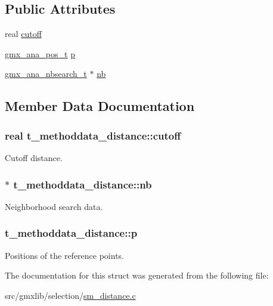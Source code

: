 \subsection*{\-Public \-Attributes}
\begin{DoxyCompactItemize}
\item 
real \hyperlink{structt__methoddata__distance_aab6198756baae9955564ed6c1bef8f35}{cutoff}
\item 
\hyperlink{structgmx__ana__pos__t}{gmx\-\_\-ana\-\_\-pos\-\_\-t} \hyperlink{structt__methoddata__distance_a4e60cc193bb2b70b0a199f573006cc2f}{p}
\item 
\hyperlink{structgmx__ana__nbsearch__t}{gmx\-\_\-ana\-\_\-nbsearch\-\_\-t} $\ast$ \hyperlink{structt__methoddata__distance_a868ce93403a03e7463300e50cfa3bd51}{nb}
\end{DoxyCompactItemize}


\subsection{\-Member \-Data \-Documentation}
\hypertarget{structt__methoddata__distance_aab6198756baae9955564ed6c1bef8f35}{
\subsubsection[{cutoff}]{\setlength{\rightskip}{0pt plus 5cm}real {\bf t\-\_\-methoddata\-\_\-distance\-::cutoff}}}\label{structt__methoddata__distance_aab6198756baae9955564ed6c1bef8f35}
\-Cutoff distance. \hypertarget{structt__methoddata__distance_a868ce93403a03e7463300e50cfa3bd51}{
\subsubsection[{nb}]{$\ast$ {\bf t\-\_\-methoddata\-\_\-distance\-::nb}}}\label{structt__methoddata__distance_a868ce93403a03e7463300e50cfa3bd51}
\-Neighborhood search data. \hypertarget{structt__methoddata__distance_a4e60cc193bb2b70b0a199f573006cc2f}{
\subsubsection[{p}]{ {\bf t\-\_\-methoddata\-\_\-distance\-::p}}}\label{structt__methoddata__distance_a4e60cc193bb2b70b0a199f573006cc2f}
\-Positions of the reference points. 

\-The documentation for this struct was generated from the following file\-:\begin{DoxyCompactItemize}
\item 
src/gmxlib/selection/\hyperlink{sm__distance_8c}{sm\-\_\-distance.\-c}\end{DoxyCompactItemize}
